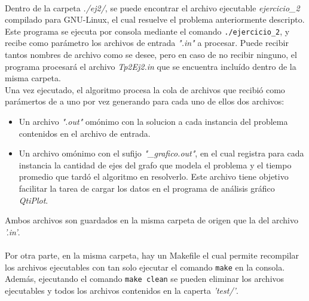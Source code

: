 \paragraph{}
Dentro de la carpeta \textit{./ej2/}, se puede encontrar el archivo ejecutable \textit{ejercicio\_2} compilado para GNU-Linux, el cual resuelve el problema anteriormente descripto. Este programa se ejecuta por consola mediante el comando \texttt{./ejercicio\_2}, y recibe como parámetro los archivos de entrada \textit{".in"} a procesar. Puede recibir tantos nombres de archivo como se desee, pero en caso de no recibir ninguno, el programa procesará el archivo \textit{Tp2Ej2.in} que se encuentra incluído dentro de la misma carpeta. \\
Una vez ejecutado, el algoritmo procesa la cola de archivos que recibió como parámertos de a uno por vez generando para cada uno de ellos dos archivos:
	\begin{itemize}
		\item{Un archivo \textit{".out"} omónimo con la solucion a cada instancia del problema contenidos en el archivo de entrada.}
		\item{Un archivo omónimo con el sufijo \textit{"\_grafico.out"}, en el cual registra para cada instancia la cantidad de ejes del grafo que modela el problema y el tiempo promedio que tardó el algoritmo en resolverlo. Este archivo tiene objetivo facilitar la tarea de cargar los datos en el programa de análisis gráfico \textit{QtiPlot}}.
	\end{itemize}

Ambos archivos son guardados en la misma carpeta de origen que la del archivo \textit{'.in'}.

\paragraph{}		
Por otra parte, en la misma carpeta, hay un Makefile el cual permite recompilar los archivos ejecutables con tan solo ejecutar el comando \texttt{make} en la consola. Además, ejecutando el comando \texttt{make clean} se pueden eliminar los archivos ejecutables y todos los archivos contenidos en la caperta \textit{'test/'}. 

